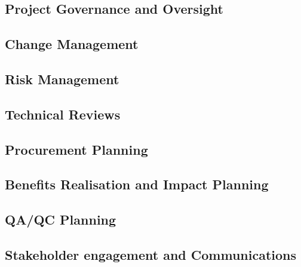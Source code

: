 \subsection{Project Governance and Oversight}
\subsection{Change Management}
\subsection{Risk Management}
\subsection{Technical Reviews}
\subsection{Procurement Planning}
\subsection{Benefits Realisation and Impact Planning}
\subsection{QA/QC Planning}
\subsection{Stakeholder engagement and Communications}
